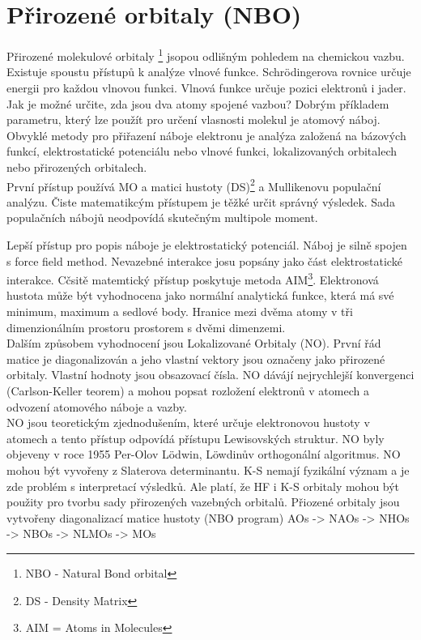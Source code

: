 \documentclass[
  digital, %
  table,   %
  lof,     %
  lot,     %
]{fithesis3}
\begin{document}
\section{Přirozené orbitaly (NBO)}
Přirozené molekulové orbitaly \footnote{NBO - Natural Bond orbital} jsopou odlišným pohledem na chemickou vazbu. Existuje spoustu přístupů k analýze vlnové funkce. Schrödingerova rovnice určuje energii pro každou vlnovou funkci. Vlnová funkce určuje pozici elektronů i jader. Jak je možné určite, zda jsou dva atomy spojené vazbou? Dobrým příkladem parametru, který lze použít pro určení vlasnosti molekul je atomový náboj. Obvyklé metody pro přiřazení náboje elektronu je analýza založená na bázových funkcí, elektrostatické potenciálu nebo vlnové funkci, lokalizovaných orbitalech nebo přirozených orbitalech. \\
První přístup používá MO a matici hustoty (DS)\footnote{DS - Density Matrix} a Mullikenovu populační analýzu. Čiste matematikcým přístupem je těžké určit správný výsledek. Sada populačních nábojů neodpovídá skutečným multipole moment.

Lepší přístup pro popis náboje je elektrostatický potenciál. Náboj je silně spojen s force field method. Nevazebné interakce josu popsány jako část elektrostatické interakce. Cčsitě matemtický přístup poskytuje metoda AIM\footnote{AIM = Atoms in Molecules}. Elektronová hustota může být vyhodnocena jako normální analytická funkce, která má své minimum, maximum a sedlové body. Hranice mezi dvěma atomy v tři dimenzionálním prostoru prostorem s dvěmi dimenzemi. \\
Dalším způsobem vyhodnocení jsou Lokalizované Orbitaly (NO).  První řád matice je diagonalizován a jeho vlastní vektory jsou označeny jako přirozené orbitaly. Vlastní hodnoty jsou obsazovací čísla. NO dávájí nejrychlejší konvergenci (Carlson-Keller teorem) a mohou popsat rozložení elektronů v atomech a odvození atomového náboje a vazby.  \cite{jensen2007introduction} \\
 NO jsou teoretickým zjednodušením, které určuje elektronovou hustoty v atomech a  tento přístup odpovídá přístupu Lewisovských struktur. NO byly objeveny v roce 1955 Per-Olov Lödwin, Löwdinův orthogonální algoritmus. NO mohou být vyvořeny z Slaterova determinantu. K-S nemají fyzikální význam a je zde problém s interpretací výsledků. Ale platí, že HF i K-S orbitaly mohou být použity pro tvorbu sady přirozených vazebných orbitalů. Přiozené orbitaly jsou vytvořeny diagonalizací matice hustoty
(NBO program)
 AOs -> NAOs -> NHOs -> NBOs -> NLMOs -> MOs
\end{document}
